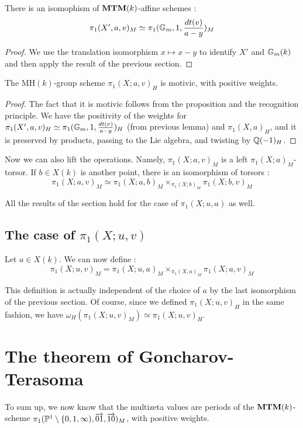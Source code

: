 \begin{lemma}
\label{pi_1_X'}
There is an isomophism of $\mathbf{MTM}(k)$-affine schemes :
\[
\pi_1(X',a,v)_M\simeq \pi_1(\mathbb{G}_m,1,\frac{dt(v)}{a-y})_M
\]
\end{lemma}
\begin{proof}
We use the translation isomorphism $x\mapsto x-y$ to identify $X'$ and $\mathbb{G}_m(k)$ and then apply the result of the previous section.
\end{proof}

\begin{cor}
The $\mathrm{MH}(k)$-group scheme $\pi_1(X;a,v)_H$ is motivic, with positive weights.
\end{cor}
\begin{proof}
  The fact that it is motivic follows from the proposition and the recognition principle. We have the positivity of the weights for $\pi_1(X',a,v)_H\simeq \pi_1(\mathbb{G}_m,1,\frac{dt(v)}{a-y})_H$ (from previous lemma) and $\pi_1(X,a)_H$, and it is preserved by products, passing to the Lie algebra, and twisting by $\mathbb{Q}(-1)_H$.
\end{proof}

Now we can also lift the operations. Namely, $\pi_1(X;a,v)_M$ is a left $\pi_1(X;a)_M$-torsor. If $b\in X(k)$ is another point, there is an isomorphism of torsors :
\[
\pi_1(X;a,v)_M\simeq \pi_1(X;a,b)_M\times_{\pi_1(X;b)_M}\pi_1(X;b,v)_M
\]

All the results of the section hold for the case of $\pi_1(X;u,a)$ as well.

\subsection{The case of $\pi_1(X;u,v)$}

\begin{defn}
Let $a\in X(k)$. We can now define :
\[
\pi_1(X;u,v)_M=\pi_1(X;u,a)_M\times_{\pi_1(X,a)_M}\pi_1(X;a,v)_M
\]
\end{defn}
This definition is actually independent of the choice of $a$ by the last isomorphism of the previous section. Of course, since we defined $\pi_1(X;u,v)_H$ in the same fashion, we have $\omega_H(\pi_1(X;u,v)_M)\simeq \pi_1(X;u,v)_H$.

\section{The theorem of Goncharov-Terasoma}

To sum up, we now know that the multizeta values are periods of the $\mathbf{MTM}(k)$-scheme $\pi_1(\mathbb{P}^1\setminus\{0,1,\infty),\overrightarrow{01},\overrightarrow{10})_M$, with positive weights. 

